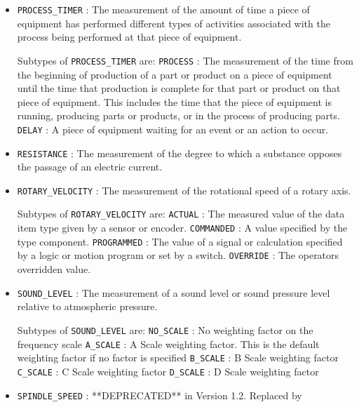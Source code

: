 \begin{itemize}
\item \texttt{PROCESS_TIMER} : The measurement of the amount of time a piece of equipment has performed different types of activities associated with the process being performed at that piece of equipment. 

Subtypes of \texttt{PROCESS_TIMER} are: 
\newline\tab \texttt{PROCESS} : The measurement of the time from the beginning of production of a part or product on a piece of equipment until the time that production is complete for that part or product on that piece of equipment.  This includes the time that the piece of equipment is running, producing parts or products, or in the process of producing parts. 
\newline\tab \texttt{DELAY} : A piece of equipment waiting for an event or an action to occur. 
\item \texttt{RESISTANCE} : The measurement of the degree to which a substance opposes the passage of an electric current. 

\item \texttt{ROTARY_VELOCITY} : The measurement of the rotational speed of a rotary axis. 

Subtypes of \texttt{ROTARY_VELOCITY} are: 
\newline\tab \texttt{ACTUAL} : The measured value of the data item type given by a sensor or encoder. 
\newline\tab \texttt{COMMANDED} : A value specified by the  type component. 
\newline\tab \texttt{PROGRAMMED} : The value of a signal or calculation specified by a logic or motion program or set by a switch. 
\newline\tab \texttt{OVERRIDE} : The operators overridden value. 
\item \texttt{SOUND_LEVEL} : The measurement of a sound level or sound pressure level relative to atmospheric pressure. 

Subtypes of \texttt{SOUND_LEVEL} are: 
\newline\tab \texttt{NO_SCALE} : No weighting factor on the frequency scale 
\newline\tab \texttt{A_SCALE} : A Scale weighting factor.   This is the default weighting factor if no factor is specified 
\newline\tab \texttt{B_SCALE} : B Scale weighting factor 
\newline\tab \texttt{C_SCALE} : C Scale weighting factor 
\newline\tab \texttt{D_SCALE} : D Scale weighting factor 
\item \texttt{SPINDLE_SPEED} : **DEPRECATED** in Version 1.2.  Replaced by  


\end{itemize}
